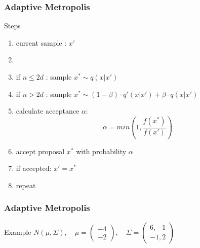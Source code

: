 \begin{frame}
\frametitle{Adaptive Metropolis}

\begin{block}{Steps}
\begin{enumerate}
  \item current sample : $x'$
  \item[]
\item if $n\leq 2d$ : sample $x^* \sim q(x | x')$
\item if $n> 2d$ : sample $x^* \sim (1-\beta) \cdot q'(x | x') +
\beta \cdot q(x | x')$
\item calculate acceptance $\alpha$:
\[\alpha = min\left(1, \frac{f(x^*)}{f(x')} \right)\]

\item accept proposal $x^*$ with probability $\alpha$
\item if accepted: $x' = x^*$
\item repeat
\end{enumerate}
\end{block}
\end{frame}


\begin{frame}
\frametitle{Adaptive Metropolis}
\begin{block}{Example}
$N(\mu, \Sigma), \quad \mu = \begin{pmatrix} -4 \\ -2
\end{pmatrix} , \quad \Sigma = \begin{pmatrix} 6,-1 \\ -1,2
\end{pmatrix}$
\end{block}
\end{frame}